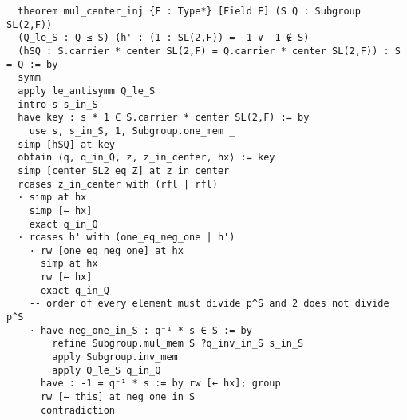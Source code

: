 \begin{footnotesize}
\begin{verbatim}
  theorem mul_center_inj {F : Type*} [Field F] (S Q : Subgroup SL(2,F))
  (Q_le_S : Q ≤ S) (h' : (1 : SL(2,F)) = -1 ∨ -1 ∉ S)
  (hSQ : S.carrier * center SL(2,F) = Q.carrier * center SL(2,F)) : S = Q := by
  symm
  apply le_antisymm Q_le_S
  intro s s_in_S
  have key : s * 1 ∈ S.carrier * center SL(2,F) := by
    use s, s_in_S, 1, Subgroup.one_mem _
  simp [hSQ] at key
  obtain ⟨q, q_in_Q, z, z_in_center, hx⟩ := key
  simp [center_SL2_eq_Z] at z_in_center
  rcases z_in_center with (rfl | rfl)
  · simp at hx
    simp [← hx]
    exact q_in_Q
  · rcases h' with (one_eq_neg_one | h')
    · rw [one_eq_neg_one] at hx
      simp at hx
      rw [← hx]
      exact q_in_Q
    -- order of every element must divide p^S and 2 does not divide p^S
    · have neg_one_in_S : q⁻¹ * s ∈ S := by
        refine Subgroup.mul_mem S ?q_inv_in_S s_in_S
        apply Subgroup.inv_mem
        apply Q_le_S q_in_Q
      have : -1 = q⁻¹ * s := by rw [← hx]; group
      rw [← this] at neg_one_in_S
      contradiction
\end{verbatim}
\end{footnotesize}

